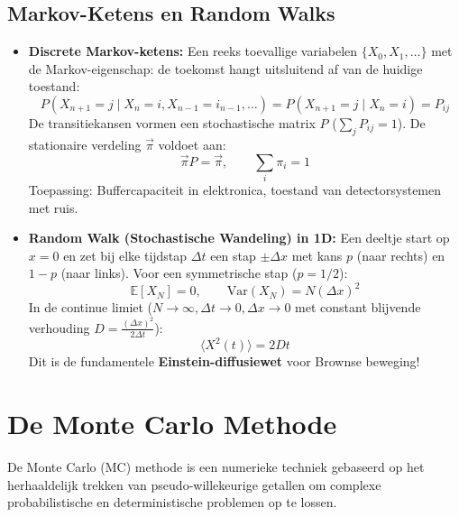 \documentclass[11pt,a4paper]{article}
\newcommand{\E}{\mathbb{E}}
\newcommand{\Var}{\text{Var}}
\begin{document}
\subsection{Markov-Ketens en Random Walks}
\begin{itemize}[leftmargin=1.5em]
    \item \textbf{Discrete Markov-ketens:} Een reeks toevallige variabelen $\{X_0, X_1, \ldots\}$ met de Markov-eigenschap: de toekomst hangt uitsluitend af van de huidige toestand:
    \begin{equation}
        P(X_{n+1} = j \mid X_n = i, X_{n-1} = i_{n-1}, \ldots) = P(X_{n+1} = j \mid X_n = i) = P_{ij}
    \end{equation}
    De transitiekansen vormen een stochastische matrix $P$ ($\sum_j P_{ij} = 1$). De stationaire verdeling $\vec{\pi}$ voldoet aan:
    \begin{equation}
        \vec{\pi} P = \vec{\pi}, \qquad \sum_i \pi_i = 1
    \end{equation}
    Toepassing: Buffercapaciteit in elektronica, toestand van detectorsystemen met ruis.
    \item \textbf{Random Walk (Stochastische Wandeling) in 1D:}
    Een deeltje start op $x = 0$ en zet bij elke tijdstap $\Delta t$ een stap $\pm \Delta x$ met kans $p$ (naar rechts) en $1 - p$ (naar links).
    Voor een symmetrische stap ($p = 1/2$):
    \begin{equation}
        \E[X_N] = 0, \qquad \Var(X_N) = N (\Delta x)^2
    \end{equation}
    In de continue limiet ($N \to \infty, \Delta t \to 0, \Delta x \to 0$ met constant blijvende verhouding $D = \frac{(\Delta x)^2}{2\Delta t}$):
    \begin{equation}
        \langle X^2(t) \rangle = 2Dt
    \end{equation}
    Dit is de fundamentele \textbf{Einstein-diffusiewet} voor Brownse beweging!
\end{itemize}


\section{De Monte Carlo Methode}

De Monte Carlo (MC) methode is een numerieke techniek gebaseerd op het herhaaldelijk trekken van pseudo-willekeurige getallen om complexe probabilistische en deterministische problemen op te lossen.
\end{document}
